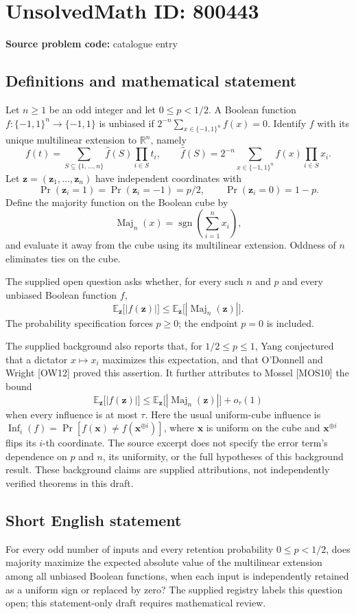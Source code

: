 \documentclass[11pt]{article}
\newcommand{\R}{\mathbb{R}}
\begin{document}
\section*{UnsolvedMath ID: 800443}
\textbf{Source problem code:} catalogue entry
\subsection{Definitions and mathematical statement}
Let \(n\geq 1\) be an odd integer and let \(0\leq p<1/2\). A Boolean function \(f:\{-1,1\}^n\to\{-1,1\}\) is unbiased if \(2^{-n}\sum_{x\in\{-1,1\}^n}f(x)=0\). Identify \(f\) with its unique multilinear extension to \(\R^n\), namely
\[
f(t)=\sum_{S\subseteq\{1,\ldots,n\}}\widehat f(S)\prod_{i\in S}t_i,
\qquad
\widehat f(S)=2^{-n}\sum_{x\in\{-1,1\}^n}f(x)\prod_{i\in S}x_i.
\]
Let \(\mathbf z=(\mathbf z_1,\ldots,\mathbf z_n)\) have independent coordinates with
\[
\Pr(\mathbf z_i=1)=\Pr(\mathbf z_i=-1)=p/2,
\qquad
\Pr(\mathbf z_i=0)=1-p.
\]
Define the majority function on the Boolean cube by
\[
\operatorname{Maj}_n(x)=\operatorname{sgn}\!\left(\sum_{i=1}^n x_i\right),
\]
and evaluate it away from the cube using its multilinear extension. Oddness of \(n\) eliminates ties on the cube.

The supplied open question asks whether, for every such \(n\) and \(p\) and every unbiased Boolean function \(f\),
\[
\mathbb E_{\mathbf z}\bigl[|f(\mathbf z)|\bigr]
\leq
\mathbb E_{\mathbf z}\bigl[|\operatorname{Maj}_n(\mathbf z)|\bigr].
\]
The probability specification forces \(p\geq0\); the endpoint \(p=0\) is included.

The supplied background also reports that, for \(1/2\leq p\leq1\), Yang conjectured that a dictator \(x\mapsto x_i\) maximizes this expectation, and that O'Donnell and Wright [OW12] proved this assertion. It further attributes to Mossel [MOS10] the bound
\[
\mathbb E_{\mathbf z}\bigl[|f(\mathbf z)|\bigr]
\leq
\mathbb E_{\mathbf z}\bigl[|\operatorname{Maj}_n(\mathbf z)|\bigr]+o_\tau(1)
\]
when every influence is at most \(\tau\). Here the usual uniform-cube influence is \(\operatorname{Inf}_i(f)=\Pr[f(\mathbf x)\ne f(\mathbf x^{\oplus i})]\), where \(\mathbf x\) is uniform on the cube and \(\mathbf x^{\oplus i}\) flips its \(i\)-th coordinate. The source excerpt does not specify the error term's dependence on \(p\) and \(n\), its uniformity, or the full hypotheses of this background result. These background claims are supplied attributions, not independently verified theorems in this draft.
\subsection{Short English statement}
For every odd number of inputs and every retention probability \(0\leq p<1/2\), does majority maximize the expected absolute value of the multilinear extension among all unbiased Boolean functions, when each input is independently retained as a uniform sign or replaced by zero? The supplied registry labels this question open; this statement-only draft requires mathematical review.
\end{document}
